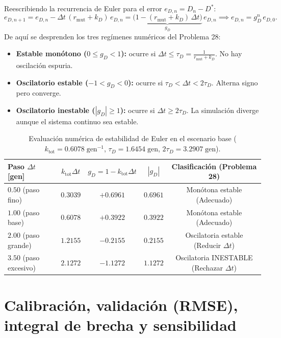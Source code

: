 \documentclass[11pt,a4paper]{article}
\begin{document}
Reescribiendo la recurrencia de Euler para el error $e_{D,n} = D_n - D^*$:
\begin{equation}
e_{D,n+1} = e_{D,n} - \Delta t\,(r_{\text{mut}} + k_D)\,e_{D,n} = \underbrace{\Big(1 - (r_{\text{mut}} + k_D)\,\Delta t\Big)}_{g_D}\,e_{D,n} \implies e_{D,n} = g_D^n\,e_{D,0}.
\end{equation}
De aqu\'i se desprenden los tres reg\'imenes num\'ericos del Problema 28:
\begin{itemize}[leftmargin=1.5em]
    \item \textbf{Estable mon\'otono ($0 \le g_D < 1$):} ocurre si $\Delta t \le \tau_D = \frac{1}{r_{\text{mut}}+k_D}$. No hay oscilaci\'on espuria.
    \item \textbf{Oscilatorio estable ($-1 < g_D < 0$):} ocurre si $\tau_D < \Delta t < 2\tau_D$. Alterna signo pero converge.
    \item \textbf{Oscilatorio inestable ($|g_D| \ge 1$):} ocurre si $\Delta t \ge 2\tau_D$. La simulaci\'on diverge aunque el sistema continuo sea estable.
\end{itemize}

\begin{table}[h]
\centering
\caption{Evaluaci\'on num\'erica de estabilidad de Euler en el escenario base ($k_{\text{tot}} = 0.6078\;\text{gen}^{-1}$, $\tau_D = 1.6454\;\text{gen}$, $2\tau_D = 3.2907\;\text{gen}$).}
\begin{tabular}{@{}lcccc@{}}
\toprule
\textbf{Paso $\Delta t$ [gen]} & $k_{\text{tot}}\Delta t$ & $g_D = 1 - k_{\text{tot}}\Delta t$ & $|g_D|$ & \textbf{Clasificaci\'on (Problema 28)} \\
\midrule
$0.50$ (paso fino) & $0.3039$ & $+0.6961$ & $0.6961$ & Mon\'otona estable (Adecuado) \\
$1.00$ (paso base) & $0.6078$ & $+0.3922$ & $0.3922$ & Mon\'otona estable (Adecuado) \\
$2.00$ (paso grande) & $1.2155$ & $-0.2155$ & $0.2155$ & Oscilatoria estable (Reducir $\Delta t$) \\
$3.50$ (paso excesivo) & $2.1272$ & $-1.1272$ & $1.1272$ & Oscilatoria INESTABLE (Rechazar $\Delta t$) \\
\bottomrule
\end{tabular}
\end{table}

\section{Calibraci\'on, validaci\'on (RMSE), integral de brecha y sensibilidad}
\end{document}
